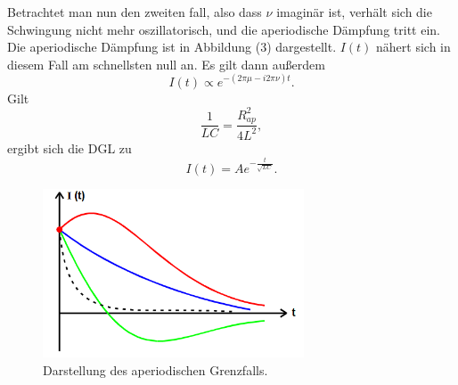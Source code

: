 \noindent Betrachtet man nun den zweiten fall, also dass $\nu$ imaginär ist, verhält sich die Schwingung nicht mehr oszillatorisch, und die aperiodische Dämpfung tritt ein.
Die aperiodische Dämpfung ist in Abbildung (3) dargestellt. $I(t)$ nähert sich in diesem Fall am schnellsten null an.
Es gilt dann außerdem
\begin{equation}
I(t) \propto e^{-(2\pi \mu - i2\pi \nu)t} .
\end{equation}
Gilt
\begin{equation}
\frac{1}{LC} = \frac{R_{ap}^2}{4L^2} ,
\end{equation}
ergibt sich die DGL zu
\begin{equation}
I(t) = A e^{-\frac{t}{\sqrt{LC}}} .
\end{equation}
\begin{figure}[H]
  \centering
  \includegraphics[height=5cm]{aperiodisch.png}
  \caption{Darstellung des aperiodischen Grenzfalls. \cite[S.5]{kent}}
\end{figure}




